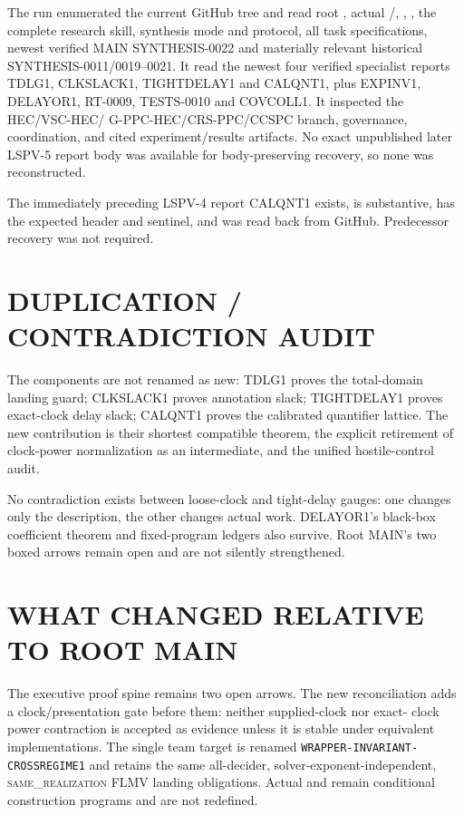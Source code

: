 \documentclass[11pt]{article}
\newcommand{\same}{\textsc{same\_realization}}
\begin{document}
The run enumerated the current GitHub tree and read root ,
actual /, , ,
the complete research skill, synthesis mode and protocol, all task
specifications, newest verified MAIN SYNTHESIS-0022 and materially relevant
historical SYNTHESIS-0011/0019--0021.  It read the newest four verified
specialist reports TDLG1, CLKSLACK1, TIGHTDELAY1 and CALQNT1, plus EXPINV1,
DELAYOR1, RT-0009, TESTS-0010 and COVCOLL1.  It inspected the HEC/VSC-HEC/
G-PPC-HEC/CRS-PPC/CCSPC branch, governance, coordination, and cited
experiment/results artifacts.  No exact unpublished later LSPV-5 report body
was available for body-preserving recovery, so none was reconstructed.

The immediately preceding LSPV-4 report CALQNT1 exists, is substantive, has
the expected header and sentinel, and was read back from GitHub.  Predecessor
recovery was not required.

\section{DUPLICATION / CONTRADICTION AUDIT}

The components are not renamed as new: TDLG1 proves the total-domain landing
guard; CLKSLACK1 proves annotation slack; TIGHTDELAY1 proves exact-clock delay
slack; CALQNT1 proves the calibrated quantifier lattice.  The new contribution
is their shortest compatible theorem, the explicit retirement of clock-power
normalization as an intermediate, and the unified hostile-control audit.

No contradiction exists between loose-clock and tight-delay gauges: one
changes only the description, the other changes actual work.  DELAYOR1's
black-box coefficient theorem and fixed-program ledgers also survive.  Root
MAIN's two boxed arrows remain open and are not silently strengthened.

\section{WHAT CHANGED RELATIVE TO ROOT MAIN}

The executive proof spine remains two open arrows.  The new reconciliation
adds a clock/presentation gate before them: neither supplied-clock nor exact-
clock power contraction is accepted as evidence unless it is stable under
equivalent implementations.  The single team target is renamed
\texttt{WRAPPER-INVARIANT-CROSSREGIME1} and retains the same all-decider,
solver-exponent-independent, \same{} FLMV landing obligations.  Actual
 and  remain conditional construction
programs and are not redefined.
\end{document}
